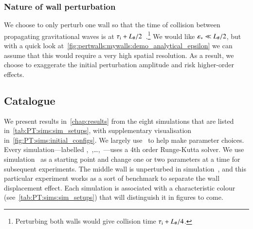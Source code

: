 \subsubsection{Nature of wall perturbation}
    We choose to only perturb one wall so that the time of collision between propagating gravitational waves is at $ \tau_\mathrm{i} + L_\#/2$~.\footnote{
        Perturbing both walls would give collision time $\tau_\mathrm{i} + L_{\#}/4$.
    } %
    We would like $\varepsilon_\ast \ll L_\#/2$, but with a quick look at~\cref{fig:pertwalls:mywalls:demo_analytical_epsilon} we can assume that this would require a very high spatial resolution. As a result, we choose to exaggerate the initial perturbation amplitude and risk higher-order effects. %


    







\subsection{Catalogue}

   


    We present results in~\cref{chap:results} from the eight simulations that are listed in~\cref{tab:PT:sims:sim_setups}, with supplementary visualisation in~\cref{fig:PT:sims:initial_configs}. %
    We largely use~\citet{christiansenAsimulationDomainFormation2024} to help make parameter choices. 
    Every simulation---labelled ,~,\dots,~---uses a 4th order Runge-Kutta solver. 
    We use simulation~ as a starting point and change one or two parameters at a time for subsequent experiments. The middle wall is unperturbed in simulation~, and this particular experiment works as a sort of benchmark to separate the wall displacement effect. 
    Each simulation is associated with a characteristic colour (see~\cref{tab:PT:sims:sim_setups}) that will distinguish it in figures to come.

